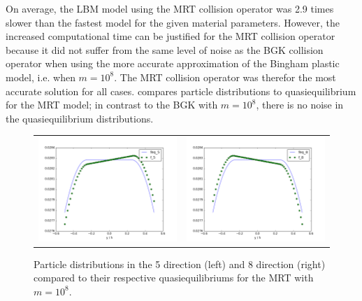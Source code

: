 \documentclass{article}
\begin{document}
On average, the LBM model using the MRT collision operator was 2.9 times slower than the fastest model for the given material parameters.
However, the increased computational time can be justified for the MRT collision operator because it did not suffer from the same level of noise as the BGK collision operator when using the more accurate approximation of the Bingham plastic model, i.e. when $m = 10^8$. 
The MRT collision operator was therefor the most accurate solution for all cases.
 compares particle distributions to quasiequilibrium for the MRT model; in contrast to the BGK with $m = 10^8$, there is no noise in the quasiequilibrium distributions.

\begin{figure}
    \begin{tabulary}{\linewidth}{c c}
        \includegraphics[width=2.1in]{figs/poise-bingham/mrt/feq-vs-f_5.png}
        &
        \includegraphics[width=2.1in]{figs/poise-bingham/mrt/feq-vs-f_8.png}
    \end{tabulary}
    \caption{Particle distributions in the 5 direction (left) and 8 direction (right) compared to their respective quasiequilibriums for the MRT with $m = 10^8$.}
    \label{fig:feq-vs-f_mrt}
\end{figure}
\end{document}
